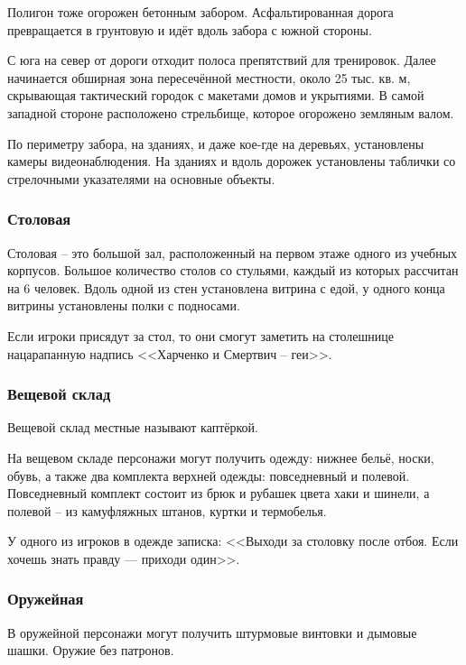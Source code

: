 \documentclass{article}
\begin{document}
Полигон тоже огорожен бетонным забором. Асфальтированная дорога
превращается в грунтовую и идёт вдоль забора с южной стороны.

С юга на север от дороги отходит полоса препятствий для тренировок.
Далее начинается обширная зона пересечённой местности, около 25 тыс. кв.
м, скрывающая тактический городок с макетами домов и укрытиями. В самой
западной стороне расположено стрельбище, которое огорожено земляным
валом.

По периметру забора, на зданиях, и даже кое-где на деревьях, установлены
камеры видеонаблюдения. На зданиях и вдоль дорожек установлены таблички
со стрелочными указателями на основные объекты.

\subsubsection{Столовая}\label{mess-hall}

Столовая -- это большой зал, расположенный на первом этаже одного из
учебных корпусов. Большое количество столов со стульями, каждый из
которых рассчитан на 6 человек. Вдоль одной из стен установлена витрина
с едой, у одного конца витрины установлены полки с подносами.

Если игроки присядут за стол, то они смогут заметить на столешнице
нацарапанную надпись <<Харченко и Смертвич -- геи>>.

\subsubsection{\texorpdfstring{Вещевой склад
}{Вещевой склад }}\label{supply-warehouse}

Вещевой склад местные называют каптёркой.

На вещевом складе персонажи могут получить одежду: нижнее бельё, носки,
обувь, а также два комплекта верхней одежды: повседневный и полевой.
Повседневный комплект состоит из брюк и рубашек цвета хаки и шинели, а
полевой -- из камуфляжных штанов, куртки и термобелья.

У одного из игроков в одежде записка: <<Выходи за столовку после отбоя.
Если хочешь знать правду --- приходи один>>.

\subsubsection{Оружейная}\label{armory}

В оружейной персонажи могут получить штурмовые винтовки и дымовые шашки.
Оружие без патронов.
\end{document}
